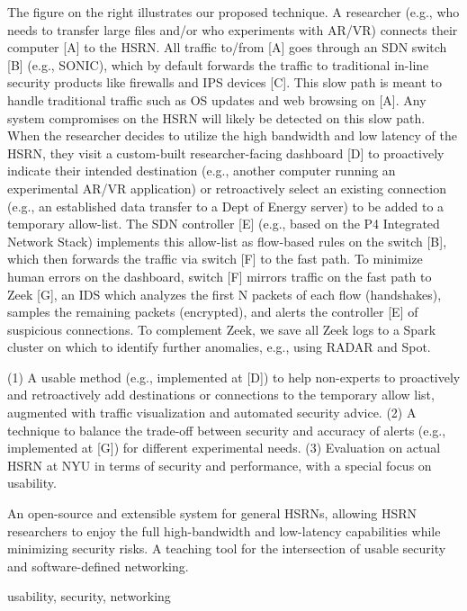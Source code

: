The figure on the right illustrates our proposed technique. A researcher (e.g., who needs to transfer large files and/or who experiments with AR/VR) connects their computer [A] to the HSRN. All traffic to/from [A] goes through an SDN switch [B] (e.g., SONIC), which by default forwards the traffic to traditional in-line security products like firewalls and IPS devices [C]. This slow path is meant to handle traditional traffic such as OS updates and web browsing on [A]. Any system compromises on the HSRN will likely be detected on this slow path. When the researcher decides to utilize the high bandwidth and low latency of the HSRN, they visit a custom-built researcher-facing dashboard [D] to proactively indicate their intended destination (e.g., another computer running an experimental AR/VR application) or retroactively select an existing connection (e.g., an established data transfer to a Dept of Energy server) to be added to a temporary allow-list. The SDN controller [E] (e.g., based on the P4 Integrated Network Stack) implements this allow-list as flow-based rules on the switch [B], which then forwards the traffic via switch [F] to the fast path. To minimize human errors on the dashboard, switch [F] mirrors traffic on the fast path to Zeek [G], an IDS which analyzes the first N packets of each flow (handshakes), samples the remaining packets (encrypted), and alerts the controller [E] of suspicious connections. To complement Zeek, we save all Zeek logs to a Spark cluster on which to identify further anomalies, e.g., using RADAR and Spot.

 (1) A usable method (e.g., implemented at [D]) to help non-experts to proactively and retroactively add destinations or connections to the temporary allow list, augmented with traffic visualization and automated security advice. (2) A technique to balance the trade-off between security and accuracy of alerts (e.g., implemented at [G]) for different experimental needs. (3) Evaluation on actual HSRN at NYU in terms of security and performance, with a special focus on usability.

 An open-source and extensible system for general HSRNs, allowing HSRN researchers to enjoy the full high-bandwidth and low-latency capabilities while minimizing security risks. A teaching tool for the intersection of usable security and software-defined networking.


 usability, security, networking
